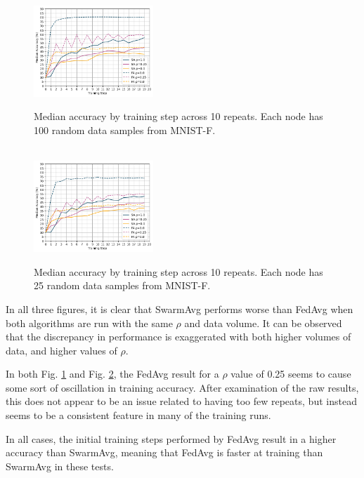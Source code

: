 \documentclass[letterpaper, 10 pt, conference]{ieeeconf}  %
\begin{document}
\begin{figure}[H] 
	 \\
	\includegraphics[width=0.4\textwidth]{conf_sparse_ns100_cl3}
	\caption{Median accuracy by training step across 10 repeats. Each node has 100 random data samples from MNIST-F.}
	\label{aeg8}
\end{figure}

\begin{figure}[H] 
	 \\
	\includegraphics[width=0.4\textwidth]{conf_sparse_ns25_cl3}
	\caption{Median accuracy by training step across 10 repeats. Each node has 25 random data samples from MNIST-F.}
	\label{aeg9}
\end{figure}

In all three figures, it is clear that SwarmAvg performs worse than FedAvg when both algorithms are run with the same $\rho$ and data volume. It can be observed that the discrepancy in performance is exaggerated with both higher volumes of data, and higher values of $\rho$.

In both Fig. \ref{aeg8} and Fig. \ref{aeg9}, the FedAvg result for a $\rho$ value of 0.25 seems to cause some sort of oscillation in training accuracy. After examination of the raw results, this does not appear to be an issue related to having too few repeats, but instead seems to be a consistent feature in many of the training runs.

In all cases, the initial training steps performed by FedAvg result in a higher accuracy than SwarmAvg, meaning that FedAvg is faster at training than SwarmAvg in these tests.
\end{document}
